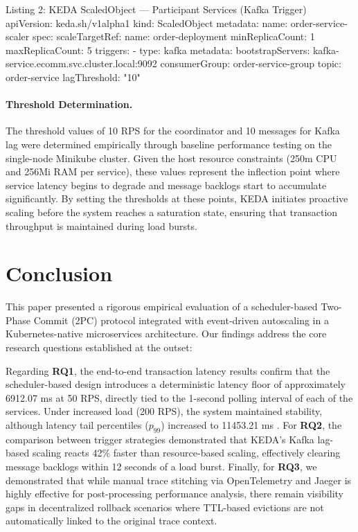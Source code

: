 \begin{kedabox}{Listing 2: KEDA ScaledObject --- Participant Services (Kafka Trigger)}
apiVersion: keda.sh/v1alpha1
kind: ScaledObject
metadata:
  name: order-service-scaler
spec:
  scaleTargetRef: {name: order-deployment}
  minReplicaCount: 1
  maxReplicaCount: 5
  triggers:
    - type: kafka
      metadata:
        bootstrapServers: kafka-service.ecomm.svc.cluster.local:9092
        consumerGroup: order-service-group
        topic: order-service
        lagThreshold: "10"
\end{kedabox}

\paragraph{Threshold Determination.}
The threshold values of 10 RPS for the coordinator and 10 messages for Kafka lag were determined empirically through baseline performance testing on the single-node Minikube cluster. Given the host resource constraints (250m CPU and 256Mi RAM per service), these values represent the inflection point where service latency begins to degrade and message backlogs start to accumulate significantly. By setting the thresholds at these points, KEDA initiates proactive scaling before the system reaches a saturation state, ensuring that transaction throughput is maintained during load bursts.

\section{Conclusion}
\label{sec:conclusion}

This paper presented a rigorous empirical evaluation of a scheduler-based Two-Phase Commit (2PC) protocol integrated with event-driven autoscaling in a Kubernetes-native microservices architecture. Our findings address the core research questions established at the outset:

Regarding \textbf{RQ1}, the end-to-end transaction latency results confirm that the scheduler-based design introduces a deterministic latency floor of approximately 6912.07 ms at 50 RPS, directly tied to the 1-second polling interval of each of the services. Under increased load (200 RPS), the system maintained stability, although latency tail percentiles ($p_{99}$) increased to 11453.21 ms . For \textbf{RQ2}, the comparison between trigger strategies demonstrated that KEDA's Kafka lag-based scaling reacts 42\% faster than resource-based scaling, effectively clearing message backlogs within 12 seconds of a load burst. Finally, for \textbf{RQ3}, we demonstrated that while manual trace stitching via OpenTelemetry and Jaeger is highly effective for post-processing performance analysis, there remain visibility gaps in decentralized rollback scenarios where TTL-based evictions are not automatically linked to the original trace context.
\\
\\

